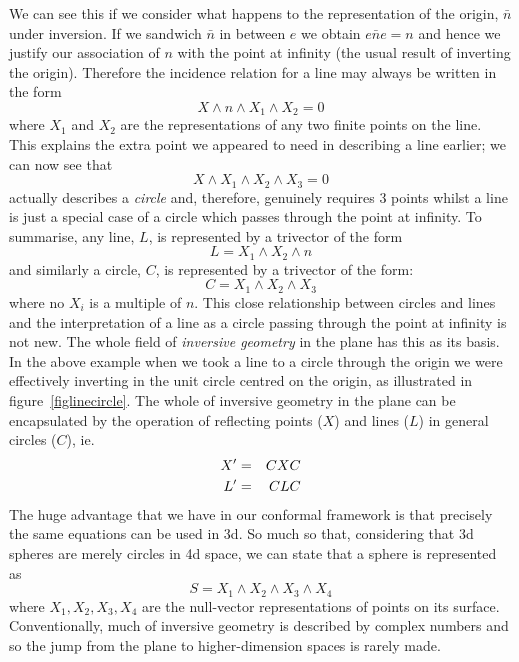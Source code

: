 We can see this if we consider what happens to the representation of the
origin, $\bar{n}$ under inversion. If we sandwich $\bar{n}$ in between $e$
we obtain $e\bar{n}e = n$ and hence we justify our association of $n$
with the point at infinity (the usual result of inverting the origin).
Therefore the incidence relation for a line may always be written in the
form
%
\begin{equation}
    X \wedge n \wedge X_1 \wedge X_2 = 0
    \end{equation}
%
where $X_1$ and $X_2$ are the representations of any two finite points 
on the line. This explains the extra point we appeared to need in
describing a line earlier; we can now see that
%
\[     X \wedge X_1 \wedge X_2 \wedge X_3 = 0 \]
%
actually describes a \emph{circle} and, therefore, genuinely requires 3 points
whilst a line is just a special case of a circle which passes through the point
at infinity.  To summarise, any line, $L$, is represented by a trivector of the
form
%
\begin{equation}
    L =  X_1 \wedge X_2 \wedge n
    \end{equation}
%
and similarly a circle, $C$, is represented by a trivector
of the form:
%
\begin{equation}
    C =  X_1 \wedge X_2 \wedge X_3
    \end{equation}
%
where no $X_i$ is a multiple of $n$. This close
relationship between circles and lines and the
interpretation of a line as a circle passing through the
point at infinity is not new. The whole field of
\emph{inversive geometry} \cite{Brannan} in the plane has
this as its basis. In the above example when we took a
line to a circle through the origin we were effectively
inverting in the unit circle centred on the origin, as
illustrated in figure~\ref{figlinecircle}. The whole of
inversive geometry in the plane can be encapsulated by
the operation of reflecting points ($X$) and lines ($L$)
in general circles ($C$), ie.
%
\begin{eqnarray}
   X' & = & CXC  \nonumber \\
   L' & = & CLC \nonumber
   \end{eqnarray}
%
The huge advantage that we have in our conformal
framework is that precisely the same equations can be
used in 3d. So much so that, considering that 3d spheres
are merely circles in 4d space, we can state that a sphere
is represented as 
%
\begin{equation}
    S =  X_1 \wedge X_2 \wedge X_3 \wedge X_4
    \end{equation}
%
where $X_1, X_2, X_3, X_4$ are the null-vector representations
of points on its surface.
Conventionally, much of inversive geometry
is described by complex numbers and so the jump from the
plane to higher-dimension spaces is rarely made.


